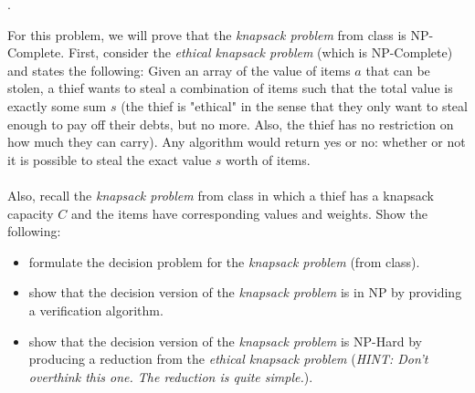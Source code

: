\documentclass[12pt]{article}
\newcounter{quesnum}
\newcommand{\question}[2][??]{
\begin{list}{\labelitemi}{\leftmargin=2em}
\item [\arabic{quesnum}.] {#2}
\end{list}
\addtocounter{quesnum}{1}
}
\begin{document}
\question[3]{
For this problem, we will prove that the \emph{knapsack problem} from class is NP-Complete. First, consider the \emph{ethical knapsack problem} (which is NP-Complete) and states the following: Given an array of the value of items $a$ that can be stolen, a thief wants to steal a combination of items such that the total value is exactly some sum $s$ (the thief is "ethical" in the sense that they only want to steal enough to pay off their debts, but no more. Also, the thief has no restriction on how much they can carry). Any algorithm would return yes or no: whether or not it is possible to steal the exact value $s$ worth of items.\\
\\
Also, recall the \emph{knapsack problem} from class in which a thief has a knapsack capacity $C$ and the items have corresponding values and weights. Show the following:

\begin{itemize}
\item formulate the decision problem for the \emph{knapsack problem} (from class).
\item show that the decision version of the \emph{knapsack problem} is in NP by providing a verification algorithm.
\item show that the decision version of the \emph{knapsack problem} is NP-Hard by producing a reduction from the \emph{ethical knapsack problem} (\emph{HINT: Don't overthink this one. The reduction is quite simple.}).
\end{itemize}
}


\end{document}
